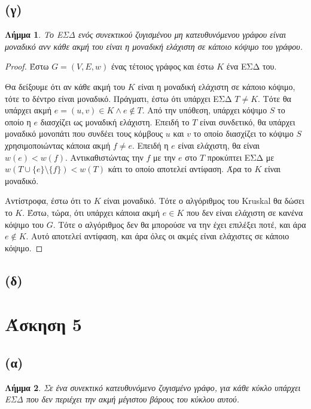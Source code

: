 \documentclass[11pt,a4paper]{book}
\newtheorem*{lemma}{Λήμμα}
\begin{document}
\subsection*{(γ)}
\begin{lemma}
Το ΕΣΔ ενός συνεκτικού ζυγισμένου μη κατευθυνόμενου γράφου είναι μοναδικό ανν κάθε ακμή του είναι η μοναδική ελάχιστη σε κάποιο κόψιμο του γράφου.
\end{lemma}

\begin{proof}
Έστω $G = (V, E, w)$ ένας τέτοιος γράφος και έστω $K$ ένα ΕΣΔ του.

Θα δείξουμε ότι αν κάθε ακμή του $K$ είναι η μοναδική ελάχιστη σε κάποιο κόψιμο, τότε το δέντρο είναι μοναδικό. Πράγματι, έστω ότι υπάρχει ΕΣΔ $T \neq K$. Τότε θα υπάρχει ακμή $e = (u, v) \in K \land e \not\in T$. Από την υπόθεση, υπάρχει κόψιμο $S$ το οποίο η $e$ διασχίζει ως μοναδική ελάχιστη. Επειδή το $T$ είναι συνδετικό, θα υπάρχει μοναδικό μονοπάτι που συνδέει τους κόμβους $u$ και $v$ το οποίο διασχίζει το κόψιμο $S$ χρησιμοποιώντας κάποια ακμή $f \neq e$. Επειδή η $e$ είναι ελάχιστη, θα είναι $w(e) < w(f)$. Αντικαθιστώντας την $f$ με την $e$ στο $T$ προκύπτει ΕΣΔ με $w( T \cup \{ e \} \setminus \{ f \} ) < w( T )$ κάτι το οποίο αποτελεί αντίφαση. Άρα το $K$ είναι μοναδικό.

Αντίστροφα, έστω ότι το $K$ είναι μοναδικό. Τότε ο αλγόριθμος του \textlatin{Kruskal} θα δώσει το $K$. Έστω, τώρα, ότι υπάρχει κάποια ακμή $e \in K$ που δεν είναι ελάχιστη σε κανένα κόψιμο του $G$. Τότε ο αλγόριθμος δεν θα μπορούσε να την έχει επιλέξει ποτέ, και άρα $e \not\in K$. Αυτό αποτελεί αντίφαση, και άρα όλες οι ακμές είναι ελάχιστες σε κάποιο κόψιμο.
\end{proof}

\subsection*{(δ)}

\section*{Άσκηση 5}
\subsection*{(α)}
\begin{lemma}
Σε ένα συνεκτικό κατευθυνόμενο ζυγισμένο γράφο, για κάθε κύκλο υπάρχει ΕΣΔ που δεν περιέχει την ακμή μέγιστου βάρους του κύκλου αυτού.
\end{lemma}
\end{document}
